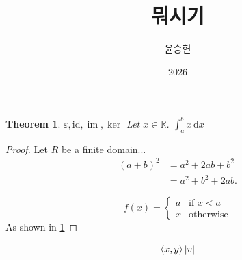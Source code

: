 \documentclass[11pt]{article}
\title{뭐시기}
\author{윤승현}
\date{2026}
\newtheorem{theorem}{Theorem}[section]
\theoremstyle{definition}
\theoremstyle{remark}
\newcommand{\R}{\mathbb{R}}
\newcommand{\eps}{\varepsilon}
\newcommand{\dd}{\,\mathrm{d}}
\newcommand{\id}{\mathrm{id}}
\newcommand{\im}{\operatorname{im}}
\newcommand{\inner}[2]{\left\langle #1, #2 \right\rangle}
\DeclarePairedDelimiter{\abs}{\lvert}{\rvert}
\begin{document}
\maketitle

\begin{theorem}
    $\eps, \id, \im, \ker$
    Let $x \in \R$. $\int_a^b x \dd x$
    \label{thm:main}
\end{theorem}

\begin{proof}
Let $R$ be a finite domain...
\begin{align*}
(a+b)^2 
  &= a^2 + 2ab + b^2 \\
  &= a^2 + b^2 + 2ab.
\end{align*}

\[
f(x)=\begin{cases}
    a & \text{if } x<a \\
    x & \text{otherwise}
\end{cases}
\]
As shown in \cref{thm:main}
\end{proof}

\[
\inner{x}{y}
\abs{v}
\]
\end{document}
